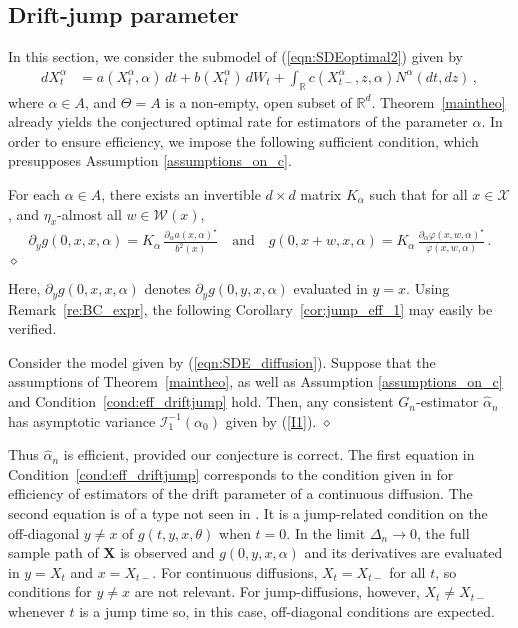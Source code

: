 \documentclass[11pt,a4paper]{article}
\newcommand{\alphan}{{\alpha_0}}
\newcommand{\RR}{{\mathbb R}}
\newcommand{\X}{{\mathbf X}}
\newcommand{\ii}{{\mathcal{I}}}
\newcommand{\xx}{{\mathcal{X}}}
\newcommand{\ww}{{\mathcal{W}}}
\newcommand{\dqed}{{\leavevmode \unskip \penalty9999 \hbox{} \nobreak \hfill \quad \hbox{$\diamond$}}}
\numberwithin{equation}{section}
\numberwithin{theorem}{section}
\begin{document}
\subsection{Drift-jump parameter}\label{generaldrift}
In this section, we consider the submodel of (\ref{eqn:SDEoptimal2}) given by
\begin{align}
dX^\alpha_t &= a(X^\alpha_t, \alpha)\, dt + b(X^\alpha_t)\, dW_t + \int_\RR
c(X^\alpha_{t-},z, \alpha) N^\alpha(dt, dz)\,, 
\label{eqn:SDE_diffusion}
\end{align}
where $\alpha \in A$, and $\Theta=A$ is a non-empty, open subset of $\RR^d$. Theorem~\ref{maintheo} already yields the conjectured optimal rate for estimators of the parameter $\alpha$. In order to ensure efficiency, we impose the following sufficient condition, which presupposes Assumption \ref{assumptions_on_c}.
%
\begin{condition}
For each $\alpha \in A$, there exists an invertible $d\times d$ matrix $K_\alpha$ such that for all $x\in\xx$, and $\eta_x$-almost all $w\in \ww(x)$,
\begin{align*}
  \partial_y g(0,x,x, \alpha) = K_\alpha \,\frac{\partial_\alpha a(x, \alpha)^\star }{b^2(x)}
  \quad \text{and}
  \quad g(0,x+w,x, \alpha) = K_\alpha\, \frac{\partial_\alpha \varphi(x,w, \alpha)^\star }{\varphi(x,w, \alpha)}\,.
\end{align*}
\dqed
\label{cond:eff_driftjump}
\end{condition}
%
Here, $\partial_y g(0,x,x, \alpha)$ denotes $\partial_y g(0,y,x, \alpha)$ evaluated in $y=x$.
Using Remark~\ref{re:BC_expr}, the following Corollary~\ref{cor:jump_eff_1} may easily be verified.
%
\begin{corollary}
Consider the model given by (\ref{eqn:SDE_diffusion}). Suppose that the assumptions of Theorem~\ref{maintheo}, as well as Assumption
\ref{assumptions_on_c} and Condition~\ref{cond:eff_driftjump} hold. Then,
any consistent $G_n$-estimator $\hat{\alpha}_n$ has asymptotic variance $\ii_1^{-1}(\alphan)$ given by (\ref{I1}).\dqed
\label{cor:jump_eff_1}
\end{corollary}
%
Thus $\hat{\alpha}_n$ is efficient, provided our conjecture is correct.
The first equation in Condition~\ref{cond:eff_driftjump} corresponds
to the condition given in \cite[Condition 1.2]{efficient} for
efficiency of estimators of the drift parameter of a continuous
diffusion. The second equation is of a type not seen in \cite{efficient}.
It is a jump-related condition on the
off-diagonal $y\neq x$ of $g(t,y,x, \theta)$ when $t=0$. In the limit $\Delta_n \to
0$, the full sample path of $\X$ is observed and $g(0,y,x, \alpha)$
and its derivatives are evaluated in $y=X_t$
and $x=X_{t-}$. For continuous diffusions, $X_t = X_{t-}$ for all $t$,
so conditions for $y\neq x$ are not relevant. For 
jump-diffusions, however, $X_t \neq X_{t-}$ whenever $t$ is a jump
time so, in this case, off-diagonal
conditions are expected.
\medskip
\end{document}
